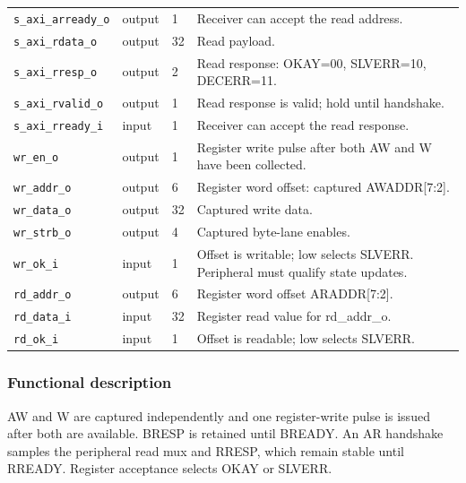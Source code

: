 \documentclass[11pt]{article}
\begin{document}
{\begin{longtable}{@{}L{0.3400\dimexpr\linewidth-36pt\relax}L{0.1000\dimexpr\linewidth-36pt\relax}L{0.1000\dimexpr\linewidth-36pt\relax}L{0.4600\dimexpr\linewidth-36pt\relax}@{}}
\texttt{s\_axi\_arready\_o} & output & 1 & Receiver can accept the read address. \\ \addlinespace[3pt]
\texttt{s\_axi\_rdata\_o} & output & 32 & Read payload. \\ \addlinespace[3pt]
\texttt{s\_axi\_rresp\_o} & output & 2 & Read response: OKAY=00, SLVERR=10, DECERR=11. \\ \addlinespace[3pt]
\texttt{s\_axi\_rvalid\_o} & output & 1 & Read response is valid; hold until handshake. \\ \addlinespace[3pt]
\texttt{s\_axi\_rready\_i} & input & 1 & Receiver can accept the read response. \\ \addlinespace[3pt]
\texttt{wr\_en\_o} & output & 1 & Register write pulse after both AW and W have been collected. \\ \addlinespace[3pt]
\texttt{wr\_addr\_o} & output & 6 & Register word offset: captured AWADDR[7:2]. \\ \addlinespace[3pt]
\texttt{wr\_data\_o} & output & 32 & Captured write data. \\ \addlinespace[3pt]
\texttt{wr\_strb\_o} & output & 4 & Captured byte-lane enables. \\ \addlinespace[3pt]
\texttt{wr\_ok\_i} & input & 1 & Offset is writable; low selects SLVERR. Peripheral must qualify state updates. \\ \addlinespace[3pt]
\texttt{rd\_addr\_o} & output & 6 & Register word offset ARADDR[7:2]. \\ \addlinespace[3pt]
\texttt{rd\_data\_i} & input & 32 & Register read value for rd\_addr\_o. \\ \addlinespace[3pt]
\texttt{rd\_ok\_i} & input & 1 & Offset is readable; low selects SLVERR. \\*
\bottomrule\end{longtable}}
\subsubsection{Functional description}
\noindent AW and W are captured independently and one register-write pulse is issued after both are available. BRESP is retained until BREADY. An AR handshake samples the peripheral read mux and RRESP, which remain stable until RREADY. Register acceptance selects OKAY or SLVERR.\par\medskip

\clearpage
\end{document}
